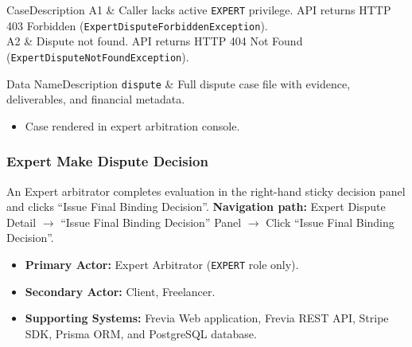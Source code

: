 \begin{flowtable}{Case}{Description}
      A1 & Caller lacks active \texttt{EXPERT} privilege. API returns HTTP 403 Forbidden (\texttt{ExpertDisputeForbiddenException}).\\ \hline
      A2 & Dispute not found. API returns HTTP 404 Not Found (\texttt{ExpertDisputeNotFoundException}).\\ \hline
\end{flowtable}

\begin{specdatatable}{Data Name}{Description}
      \texttt{dispute} & Full dispute case file with evidence, deliverables, and financial metadata.\\ \hline
\end{specdatatable}

\begin{itemize}[leftmargin=1.6em,topsep=3pt,itemsep=2pt,parsep=0pt,label=$\bullet$]
      \item Case rendered in expert arbitration console.
\end{itemize}

\subsubsection{ Expert Make Dispute Decision}

An Expert arbitrator completes evaluation in the right-hand sticky decision panel and clicks ``Issue Final Binding Decision''.\newline
\textbf{Navigation path:} Expert Dispute Detail $\rightarrow$ ``Issue Final Binding Decision'' Panel $\rightarrow$ Click ``Issue Final Binding Decision''.


\begin{itemize}[leftmargin=1.6em,topsep=3pt,itemsep=2pt,parsep=0pt,label=$\bullet$]
      \item \textbf{Primary Actor:} Expert Arbitrator (\texttt{EXPERT} role only).
      \item \textbf{Secondary Actor:} Client, Freelancer.
      \item \textbf{Supporting Systems:} Frevia Web application, Frevia REST API, Stripe SDK, Prisma ORM, and PostgreSQL database.
\end{itemize}

